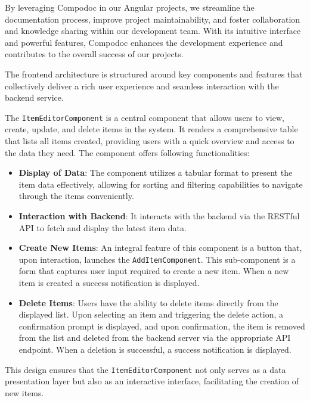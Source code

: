 By leveraging Compodoc in our Angular projects, we streamline the documentation process, improve project maintainability, and foster collaboration and knowledge sharing within our development team.
With its intuitive interface and powerful features, Compodoc enhances the development experience and contributes to the overall success of our projects.

The frontend architecture is structured around key components and features that collectively deliver a rich user experience and seamless interaction with the backend service.

The \texttt{ItemEditorComponent} is a central component that allows users to view, create, update, and delete items in the system.
It renders a comprehensive table that lists all items created, providing users with a quick overview and access to the data they need.
The component offers following functionalities:

\begin{itemize}
    \item \textbf{Display of Data}: The component utilizes a tabular format to present the item data effectively, allowing for sorting and filtering capabilities to navigate through the items conveniently.
    \item \textbf{Interaction with Backend}: It interacts with the backend via the RESTful API to fetch and display the latest item data.
    \item \textbf{Create New Items}: An integral feature of this component is a button that, upon interaction, launches the \texttt{AddItemComponent}.
    This sub-component is a form that captures user input required to create a new item. When a new item is created a success notification is displayed.
    \item \textbf{Delete Items}: Users have the ability to delete items directly from the displayed list.
    Upon selecting an item and triggering the delete action, a confirmation prompt is displayed, and upon confirmation, the item is removed from the list and deleted from the backend server via the appropriate API endpoint.
     When a deletion is successful, a success notification is displayed.
\end{itemize}

This design ensures that the \texttt{ItemEditorComponent} not only serves as a data presentation layer but also as an interactive interface, facilitating the creation of new items.

